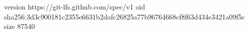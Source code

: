 version https://git-lfs.github.com/spec/v1
oid sha256:3d3c900181c2355e6631b2dafc26825a77b96764668cf8f63d434e3421a09f5c
size 87540
